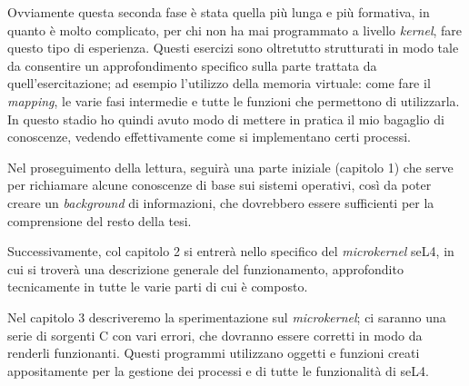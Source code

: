 Ovviamente questa seconda fase è stata quella più lunga e più formativa, in quanto è molto complicato, per chi non ha mai programmato a livello \textit{kernel}, fare questo tipo di esperienza. Questi esercizi sono oltretutto strutturati in modo tale da consentire un approfondimento specifico sulla parte trattata da quell'esercitazione; ad esempio l'utilizzo della memoria virtuale: come fare il \textit{mapping}, le varie fasi intermedie e tutte le funzioni che permettono di utilizzarla. In questo stadio ho quindi avuto modo di mettere in pratica il mio bagaglio di conoscenze, vedendo effettivamente come si implementano certi processi.
\newline

Nel proseguimento della lettura, seguirà una parte iniziale (capitolo 1) che serve per richiamare alcune conoscenze di base sui sistemi operativi, così da poter creare un \textit{background} di informazioni, che dovrebbero essere sufficienti per la comprensione del resto della tesi. 

Successivamente, col capitolo 2 si entrerà nello specifico del \textit{microkernel} seL4, in cui si troverà una descrizione generale del funzionamento, approfondito tecnicamente in tutte le varie parti di cui è composto.

Nel capitolo 3 descriveremo la sperimentazione sul \textit{microkernel}; ci saranno una serie di sorgenti C con vari errori, che dovranno essere corretti in modo da renderli funzionanti. Questi programmi utilizzano oggetti e funzioni creati appositamente per la gestione dei processi e di tutte le funzionalità di seL4. 
